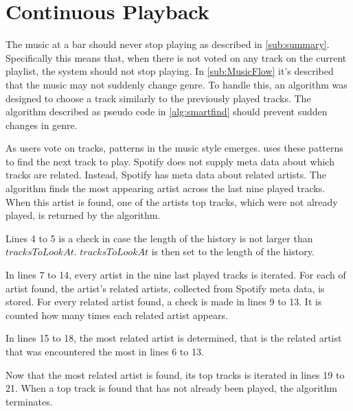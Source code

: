 \section{Continuous Playback}
\label{sec:algorithm}

The music at a bar should never stop playing as described in
\cref{sub:summary}. Specifically this means that, when there is not voted
on any track on the current playlist, the system should not stop
playing. In \cref{sub:MusicFlow} it's described that the music may not
suddenly change genre. To handle this, an algorithm was designed to
choose a track similarly to the previously played tracks. The
algorithm described as pseudo code in \cref{alg:smartfind} should
prevent sudden changes in genre.

As users vote on tracks, patterns in the music style
emerges.  uses these patterns to find the next track
to play. Spotify does not supply meta data about which tracks are
related. Instead, Spotify has meta data about related artists. The algorithm finds the most appearing artist across the last nine played tracks. When this artist is found, one of the artists top tracks, which were not already played, is returned by the algorithm.

Lines 4 to 5 is a check in case the length of the history is not larger than $tracksToLookAt$. $tracksToLookAt$ is then set to the length of the history.

In lines 7 to 14, every artist in the nine last played tracks is iterated. For each of artist found, the artist's related artists, collected from Spotify meta data, is stored. For every related artist found, a check is made in lines 9 to 13. It is counted how many times each related artist appears.

In lines 15 to 18, the most related artist is determined, that is the related artist that was encountered the most in lines 6 to 13.

Now that the most related artist is found, its top tracks is iterated in lines 19 to 21. When a top track is found that has not already been played, the algorithm terminates.


